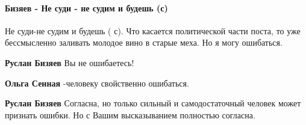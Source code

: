  
 
 
 
 
\paragraph{Бизяев - Не суди - не судим и будешь (с)}
\label{sec:31_07_2021.fb.panchenko_diana.1.oko_za_oko.cmt.bizjajev_ne_sudi}

\begin{itemize}
 

Не суди-не судим и будешь ( с). Что касается политической части поста, то уже
бессмысленно заливать молодое вино в старые меха. Но я могу ошибаться.

\begin{itemize}
 
\textbf{Руслан Бизяев} Вы не ошибаетесь!

 
\textbf{Ольга Сенная} -человеку свойственно ошибаться.

 
\textbf{Руслан Бизяев} Согласна, но только сильный и самодостаточный человек может признать ошибки. Но с Вашим высказыванием полностью согласна.
\end{itemize}


\end{itemize}
